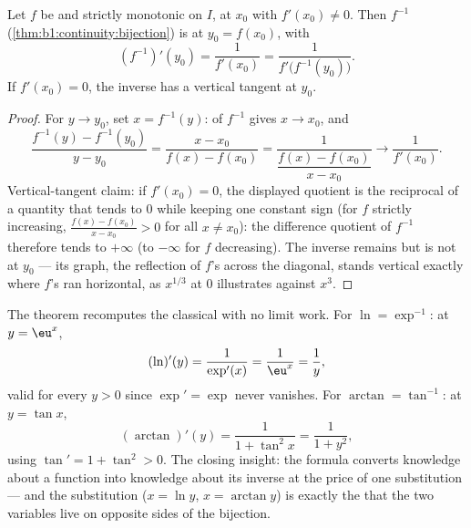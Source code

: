 \begin{theorem}\label{thm:b1:derivative:inverse}
Let $f$ be  and strictly monotonic on $I$, 
at $x_0$ with $f'(x_0) \neq 0$. Then $f^{-1}$
(\cref{thm:b1:continuity:bijection}) is  at $y_0 =
f(x_0)$, with
\[
(f^{-1})'(y_0) = \frac{1}{f'(x_0)} = \frac{1}{f'\bigl(f^{-1}(y_0)\bigr)} .
\]
If $f'(x_0) = 0$, the inverse has a vertical tangent at $y_0$.
\end{theorem}

\begin{proof}
For $y \to y_0$, set $x = f^{-1}(y)$:  of $f^{-1}$ gives $x
\to x_0$, and
\[
\frac{f^{-1}(y) - f^{-1}(y_0)}{y - y_0}
= \frac{x - x_0}{f(x) - f(x_0)}
= \frac{1}{\dfrac{f(x) - f(x_0)}{x - x_0}}
\longrightarrow \frac{1}{f'(x_0)} .
\]
Vertical-tangent claim: if $f'(x_0) = 0$, the displayed quotient
is the reciprocal of a quantity that tends to $0$ while keeping
one constant sign (for $f$ strictly increasing, $\frac{f(x) -
f(x_0)}{x - x_0} > 0$ for all $x \neq x_0$): the difference
quotient of $f^{-1}$ therefore tends to $+\infty$ (to $-\infty$
for $f$ decreasing). The inverse remains  but is not
 at $y_0$ --- its graph, the reflection of $f$'s
across the diagonal, stands vertical exactly where $f$'s ran
horizontal, as $x^{1/3}$ at $0$ illustrates against $x^3$.
\end{proof}

\begin{example}\label{ex:b1:derivative:inverseaction}
The theorem recomputes the classical  with no limit
work. For $\ln = \exp^{-1}$: at $y = \eu^x$,
\[
(\ln)'(y) = \frac{1}{\exp'(x)} = \frac{1}{\eu^{x}} = \frac1y ,
\]
valid for every $y > 0$ since $\exp' = \exp$ never vanishes. For
$\arctan = \tan^{-1}$: at $y = \tan x$,
\[
(\arctan)'(y) = \frac{1}{1 + \tan^2 x} = \frac{1}{1 + y^2} ,
\]
using $\tan' = 1 + \tan^2 > 0$. The closing insight: the formula
converts knowledge about a function into knowledge about its
inverse at the price of one substitution --- and the
substitution ($x = \ln y$, $x = \arctan y$) is exactly the
 that the two variables live on opposite sides of the
bijection.
\end{example}

